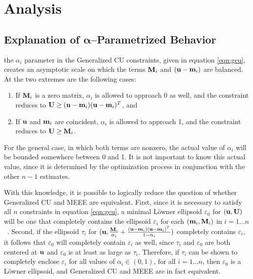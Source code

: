 \chapter{Analysis}\label{chapter:analysis}

\section{Explanation of $\mathbf{\alpha}$--Parametrized Behavior}\label{section:explanation}

 the $\alpha_i$ parameter in the Generalized CU constraints, given in equation \ref{eqn:gcu},
creates an asymptotic scale on which the terms $\mathbf{M}_i$ and $(\mathbf{u}-\mathbf{m}_i)$ are balanced. At the two extremes are the
following cases:
\begin{enumerate}
\item If $\mathbf{M}_i$ is a zero matrix, $\alpha_i$ is allowed to approach 0 as well, and the constraint reduces to
$\mathbf{U}\geq (\mathbf{u}-\mathbf{m}_i)(\mathbf{u}-\mathbf{m}_i)^T$, and
\item If $\mathbf{u}$ and $\mathbf{m}_i$ are coincident, $\alpha_i$ is allowed to approach 1, and the constraint reduces to
$\mathbf{U}\geq \mathbf{M}_i$.
\end{enumerate}
For the general case, in which both terms are nonzero, the actual value of $\alpha_i$ will be bounded somewhere between
0 and 1. It is not important to know this actual value, since it is determined by the optimization process in
conjunction with the other $n-1$ estimates.

With this knowledge, it is possible to logically reduce the question of whether Generalized CU and MEEE are equivalent.
First, since it is necessary to satisfy all $n$ constraints in equation \ref{eqn:gcu}, a minimal L\"owner
ellipsoid $\varepsilon_0$ for $(\mathbf{u},\mathbf{U})$ will be one that completely contains the ellipsoid $\varepsilon_i$ for
each $(\mathbf{m}_i,\mathbf{M}_i)$ in $i=1\dots n$~\cite{yildirim06}. Second, if the ellipsoid $\tau_i$ for
$(\mathbf{u},\frac{\mathbf{M}_i}{\alpha_i}+\frac{(\mathbf{u}-\mathbf{m}_i)(\mathbf{u}-\mathbf{m}_i)^T}{1-\alpha_i})$ completely contains
$\varepsilon_i$, it follows that $\varepsilon_0$ will completely contain $\varepsilon_i$ as well, since $\tau_i$ and
$\varepsilon_0$ are both centered at $\mathbf{u}$ and $\varepsilon_0$ is at least as large as $\tau_i$. Therefore, if
$\tau_i$ can be shown to completely enclose $\varepsilon_i$ for all values of $\alpha_i\in (0,1)$, for
all $i=1\dots n$, then $\varepsilon_0$ is a L\"owner ellipsoid, and Generalized CU and MEEE are in fact equivalent.

